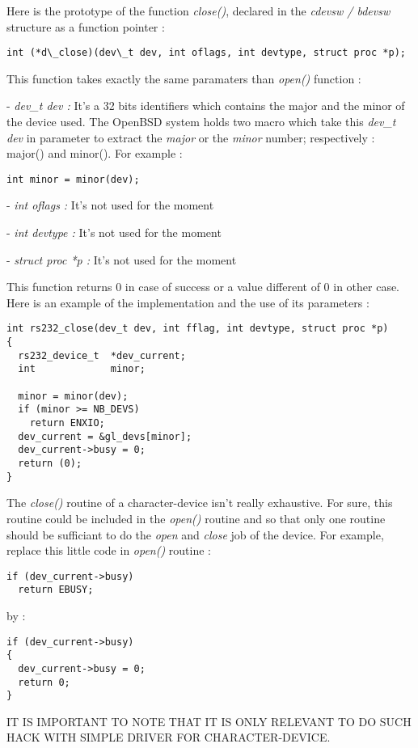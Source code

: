 \documentclass[11pt]{report}
\begin{document}
Here is the prototype of the function {\it close()}, declared in the {\it cdevsw / bdevsw} structure
as a function pointer :
\begin{lstlisting}
int (*d\_close)(dev\_t dev, int oflags, int devtype, struct proc *p);
\end{lstlisting}
This function takes exactly the same paramaters than {\it open()} function :
\begin{description}
  \item{- {\it dev\_t dev :} It's a 32 bits identifiers which contains the major and the
  minor of the device used. The OpenBSD system holds two macro which take this
  {\it dev\_t dev} in parameter to extract the {\it major} or the {\it minor} number;
  respectively : major() and minor(). For example :
  \begin{lstlisting}
int minor = minor(dev);
  \end{lstlisting}
  }
  \item{- {\it int oflags :} It's not used for the moment}
  \item{- {\it int devtype :} It's not used for the moment}
  \item{- {\it struct proc *p :} It's not used for the moment}
\end{description}
This function returns 0 in case of success or a value different of 0 in other case.\\
Here is an example of the implementation and the use of its parameters :
\begin{lstlisting}
int rs232_close(dev_t dev, int fflag, int devtype, struct proc *p)
{
  rs232_device_t  *dev_current;
  int             minor;

  minor = minor(dev);
  if (minor >= NB_DEVS)
    return ENXIO;
  dev_current = &gl_devs[minor];
  dev_current->busy = 0;
  return (0);
}
\end{lstlisting}
The {\it close()} routine of a character-device isn't really exhaustive. For sure, this routine
could be included in the {\it open()} routine and so that only one routine should be sufficiant
to do the {\it open} and {\it close} job of the device.
For example, replace this little code in {\it open()} routine :
\begin{lstlisting}
if (dev_current->busy)
  return EBUSY;
\end{lstlisting}
by :
\begin{lstlisting}
if (dev_current->busy)
{
  dev_current->busy = 0;
  return 0;
}
\end{lstlisting}
IT IS IMPORTANT TO NOTE THAT IT IS ONLY RELEVANT TO DO SUCH HACK WITH SIMPLE DRIVER FOR
CHARACTER-DEVICE.
\end{document}
